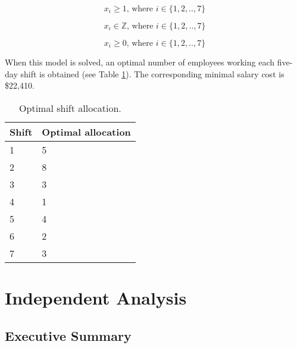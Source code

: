 \documentclass[11pt, a4paper]{article}
\begin{document}
    \begin{equation}
        x_i \geq 1 \textrm{, where } i \in \{1, 2, .., 7\}
        \label{atleast_one}
    \end{equation}

    \begin{equation}
        x_i \in \mathbb{Z} \textrm{, where } i \in \{1, 2, .., 7\}
        \label{int_constraint}
    \end{equation}

    \begin{equation}
        x_i \geq 0 \textrm{, where } i \in \{1, 2, .., 7\}
        \label{nonneg_constraint2}
    \end{equation}

    When this model is solved, an optimal number of employees working each five-day shift is obtained (see Table \ref{results2}). The corresponding minimal salary cost is \$22,410. 

    \begin{table}[!ht]
        \centering
        \caption{Optimal shift allocation.}
        \begin{tabular}{|l|l|}
            \hline
            Shift   & Optimal allocation    \\ \hline
            1       & 5                     \\ \hline
            2       & 8                     \\ \hline
            3       & 3                     \\ \hline
            4       & 1                     \\ \hline
            5       & 4                     \\ \hline
            6       & 2                     \\ \hline
            7       & 3                     \\ \hline
        \end{tabular}
        \label{results2}
    \end{table}

    \newpage

    \section{Independent Analysis}

    \subsection{Executive Summary}
\end{document}

